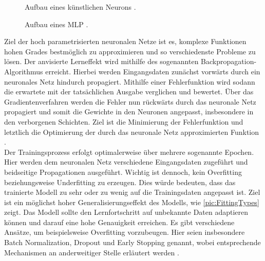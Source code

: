 \begin{figure}[h!]
  \centering
  \caption{Aufbau eines künstlichen Neurons \cite{MCC20}.}
  \label{pic:ArtificialNeuron}
\end{figure}

\begin{figure}[h!]
  \centering
  \caption{Aufbau eines MLP \cite[S.~388]{RAS19}.}
  \label{pic:MultiLayerPerceptron}
\end{figure}

\noindent
Ziel der hoch parametrisierten neuronalen Netze ist es, komplexe Funktionen hohen Grades bestmöglich zu approximieren und so verschiedenste Probleme zu lösen. Der anvisierte Lerneffekt wird mithilfe des sogenannten Backpropagation-Algorithmus erreicht. Hierbei werden Eingangsdaten zunächst vorwärts durch ein neuronales Netz hindurch propagiert. Mithilfe einer Fehlerfunktion wird sodann die erwartete mit der tatsächlichen Ausgabe verglichen und bewertet. Über das Gradientenverfahren werden die Fehler nun rückwärts durch das neuronale Netz propagiert und somit die Gewichte in den Neuronen angepasst, insbesondere in den verborgenen Schichten. Ziel ist die Minimierung der Fehlerfunktion und letztlich die Optimierung der durch das neuronale Netz approximierten Funktion \cite[S.~140, 169]{ZHA20}.\\

\noindent
Der Trainingsprozess erfolgt optimalerweise über mehrere sogenannte Epochen. Hier werden dem neuronalen Netz verschiedene Eingangsdaten zugeführt und beidseitige Propagationen ausgeführt. Wichtig ist dennoch, kein Overfitting beziehungsweise Underfitting zu erzeugen. Dies würde bedeuten, dass das trainierte Modell zu sehr oder zu wenig auf die Trainingsdaten angepasst ist. Ziel ist ein möglichst hoher Generalisierungseffekt des Modells, wie \autoref{pic:FittingTypes} zeigt. Das Modell sollte den Lernfortschritt auf unbekannte Daten adaptieren können und darauf eine hohe Genauigkeit erreichen. Es gibt verschiedene Ansätze, um beispielsweise Overfitting vorzubeugen. Hier seien insbesondere Batch Normalization, Dropout und Early Stopping genannt, wobei entsprechende Mechanismen an anderweitiger Stelle erläutert werden \cite[S.~143-149]{ZHA20}.


